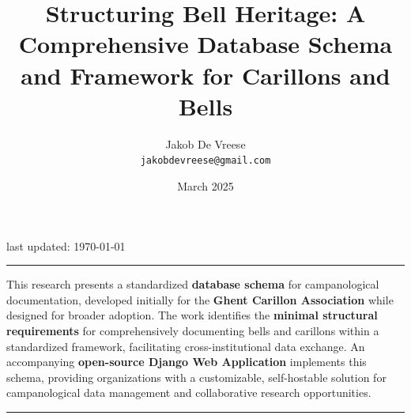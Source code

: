 \documentclass[11pt, a4paper]{article}
\title{\Huge Structuring Bell Heritage: A Comprehensive Database Schema and Framework for Carillons and Bells}
\author{\LARGE{Jakob De Vreese} \\ \texttt{\small{jakobdevreese@gmail.com}}}
\date{March 2025}
\newlength{\abstractwidth}
\begin{document}
\begin{titlepage}
    \maketitle
    \thispagestyle{empty}
    \vspace{1cm}
    \begin{center}
        \small{last updated: \today}
    \end{center}
    \vspace{2cm}
    
    \begin{center}
        \rule{\textwidth}{0.4pt}
        \vspace{1em}
        
        \begin{minipage}{\abstractwidth}
            \setlength{\rightskip}{0pt plus 1fil} %
            \justifying
            \noindent
            This research presents a standardized \textbf{database schema} for campanological documentation, developed initially for the \textbf{Ghent Carillon Association} while designed for broader adoption. The work identifies the \textbf{minimal structural requirements} for comprehensively documenting bells and carillons within a standardized framework, facilitating cross-institutional data exchange. An accompanying \textbf{open-source Django Web Application} implements this schema, providing organizations with a customizable, self-hostable solution for campanological data management and collaborative research opportunities.
          \end{minipage}
        
        \vspace{1em}
        \rule{\textwidth}{0.4pt}
    \end{center}

    \restoregeometry
\end{titlepage}


\clearpage
\setcounter{page}{1}
\tableofcontents
\clearpage

\end{document}
